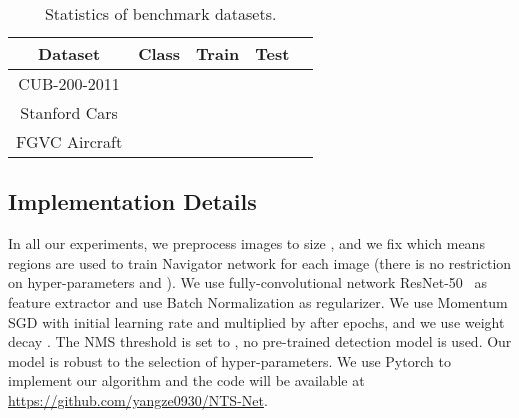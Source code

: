 \documentclass[runningheads]{llncs}
\begin{document}
\begin{table}[ht]
	\begin{center}
	\begin{tabular}{|c|c|c|c|c|}
	\hline
	Dataset & Class & Train & Test \\
	\hline\hline
	CUB-200-2011 &  &  &  \\
	\hline
	Stanford Cars &  &  &  \\
	\hline
	FGVC Aircraft &  &  &  \\
	\hline
	\end{tabular}
	\end{center}
\caption{Statistics of benchmark datasets.}
\label{data_stat}
\end{table}

\subsection{Implementation Details}
In all our experiments, we preprocess images to size , and we fix  which means  regions are used to train Navigator network for each image (there is no restriction on hyper-parameters  and ). We use fully-convolutional network ResNet-50~\cite{he2016deep} as feature extractor and use Batch Normalization as regularizer. We use Momentum SGD with initial learning rate  and multiplied by  after  epochs, and we use weight decay . The NMS threshold is set to , no pre-trained detection model is used. Our model is robust to the selection of hyper-parameters. We use Pytorch to implement our algorithm and the code will be available at \url{https://github.com/yangze0930/NTS-Net}.
\end{document}
